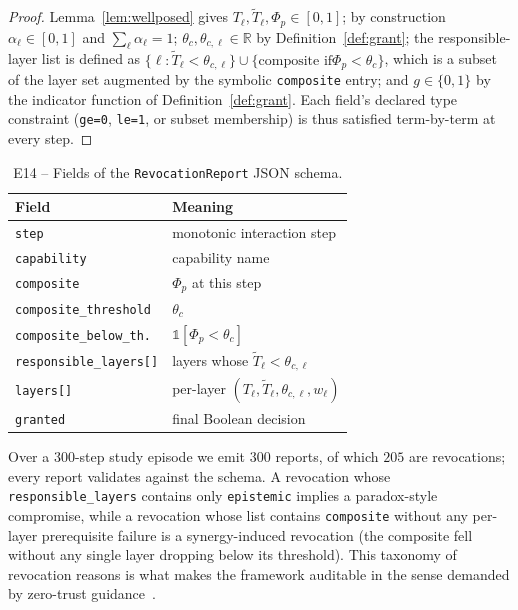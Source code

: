 \documentclass[sigconf,anonymous]{acmart}
\theoremstyle{plain}
\theoremstyle{definition}
\theoremstyle{remark}
\begin{document}
\begin{proof}
Lemma~\ref{lem:wellposed} gives $T_\ell,\tilde T_\ell,\Phi_p\in[0,1]$;
by construction $\alpha_\ell\in[0,1]$ and $\sum_\ell\alpha_\ell=1$;
$\theta_c,\theta_{c,\ell}\in\mathbb{R}$ by Definition~\ref{def:grant};
the responsible-layer list is defined as
$\{\ell:\tilde T_\ell<\theta_{c,\ell}\}\cup\{\text{composite if
$\Phi_p<\theta_c$}\}$, which is a subset of the layer set augmented by
the symbolic \texttt{composite} entry; and $g\in\{0,1\}$ by the
indicator function of Definition~\ref{def:grant}.  Each field's declared
type constraint (\texttt{ge=0}, \texttt{le=1}, or subset
membership) is thus satisfied term-by-term at every step.
\end{proof}

\begin{table}[h]
\caption{E14 -- Fields of the \texttt{RevocationReport} JSON schema.}
\label{tab:w14}
\centering\footnotesize\renewcommand{\arraystretch}{1.2}
\begin{tabular}{p{2.6cm} p{4.9cm}}
\toprule
\rowcolor{headrow}
{\color{white}\textbf{Field}} & {\color{white}\textbf{Meaning}}\\
\midrule
\texttt{step} & monotonic interaction step\\
\rowcolor{oursrow}
\texttt{capability} & capability name\\
\texttt{composite} & $\Phi_p$ at this step\\
\rowcolor{oursrow}
\texttt{composite\_threshold} & $\theta_c$\\
\texttt{composite\_below\_th.} & $\mathbb{1}[\Phi_p<\theta_c]$\\
\rowcolor{oursrow}
\texttt{responsible\_layers[]} & layers whose $\tilde T_\ell<\theta_{c,\ell}$\\
\texttt{layers[]} & per-layer $(T_\ell,\tilde T_\ell,\theta_{c,\ell},w_\ell)$\\
\rowcolor{oursrow}
\texttt{granted} & final Boolean decision\\
\bottomrule
\end{tabular}
\end{table}

Over a $300$-step study episode we emit $300$ reports, of which $205$
are revocations; every report validates against the schema.  A revocation
whose \texttt{responsible\_layers} contains only \texttt{epistemic}
implies a paradox-style compromise, while a revocation whose list
contains \texttt{composite} without any per-layer prerequisite failure
is a synergy-induced revocation (the composite fell without any single
layer dropping below its threshold).  This taxonomy of revocation
reasons is what makes the framework auditable in the sense demanded by
zero-trust guidance~\cite{nist800207}.
\end{document}
